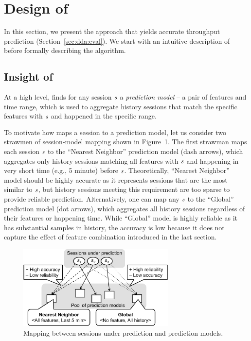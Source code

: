 \section{Design of \name}
\label{sec:dda:design}

In this section, we present the \name approach that yields accurate throughput prediction (Section~\ref{sec:dda:eval}). 
We start with an intuitive description of \name before formally describing the algorithm.



\subsection{Insight of \name}

At a high level, \name finds for any session $\mathit{s}$ a {\em prediction model} -- a pair of features and time range, which is used to aggregate history sessions that match the specific features with $\mathit{s}$ and happened in the specific range. 

To motivate how \name maps a session to a prediction model, let us consider two strawmen of session-model mapping shown in Figure~\ref{fig:tbd-motivation}. 
The first strawman maps each session $\mathit{s}$ to the ``Nearest Neighbor'' prediction model (dash arrows), which aggregates only history sessions matching all features with $\mathit{s}$ and happening in very short time (e.g., 5 minute) before $\mathit{s}$. Theoretically, ``Nearest Neighbor'' model should be highly accurate as it represents sessions that are the most similar to $\mathit{s}$, but history sessions meeting this requirement are too sparse to provide reliable prediction. 
Alternatively, one can map any $\mathit{s}$ to the ``Global'' prediction model (dot arrows), which aggregates all history sessions regardless of their features or happening time. While ``Global'' model is highly reliable as it has substantial samples in history, the accuracy is low because it does not capture the effect of feature combination introduced in the last section. 


\begin{figure}[t!]
\centering
\includegraphics[width=0.7\textwidth]{figures/dda-tbd-motivation.pdf}
\caption{Mapping between sessions under prediction and prediction models.}
\label{fig:tbd-motivation}
\end{figure}

